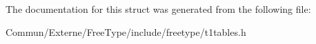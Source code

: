 The documentation for this struct was generated from the following file\+:\begin{DoxyCompactItemize}
\item 
Commun/\+Externe/\+Free\+Type/include/freetype/t1tables.\+h\end{DoxyCompactItemize}
